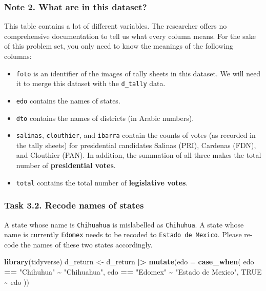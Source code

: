 \documentclass[
]{article}
\newenvironment{Shaded}{\begin{snugshade}}{\end{snugshade}}
\newcommand{\AttributeTok}[1]{\textcolor[rgb]{0.13,0.29,0.53}{#1}}
\newcommand{\ConstantTok}[1]{\textcolor[rgb]{0.56,0.35,0.01}{#1}}
\newcommand{\FunctionTok}[1]{\textcolor[rgb]{0.13,0.29,0.53}{\textbf{#1}}}
\newcommand{\NormalTok}[1]{#1}
\newcommand{\OtherTok}[1]{\textcolor[rgb]{0.56,0.35,0.01}{#1}}
\newcommand{\SpecialCharTok}[1]{\textcolor[rgb]{0.81,0.36,0.00}{\textbf{#1}}}
\newcommand{\StringTok}[1]{\textcolor[rgb]{0.31,0.60,0.02}{#1}}
\begin{document}
\clearpage

\hypertarget{note-2.-what-are-in-this-dataset}{%
\subsubsection{Note 2. What are in this
dataset?}\label{note-2.-what-are-in-this-dataset}}

This table contains a lot of different variables. The researcher offers
no comprehensive documentation to tell us what every column means. For
the sake of this problem set, you only need to know the meanings of the
following columns:

\begin{itemize}
\item
  \texttt{foto} is an identifier of the images of tally sheets in this
  dataset. We will need it to merge this dataset with the
  \texttt{d\_tally} data.
\item
  \texttt{edo} contains the names of states.
\item
  \texttt{dto} contains the names of districts (in Arabic numbers).
\item
  \texttt{salinas}, \texttt{clouthier}, and \texttt{ibarra} contain the
  counts of votes (as recorded in the tally sheets) for presidential
  candidates Salinas (PRI), Cardenas (FDN), and Clouthier (PAN). In
  addition, the summation of all three makes the total number of
  \textbf{presidential votes}.
\item
  \texttt{total} contains the total number of \textbf{legislative
  votes}.
\end{itemize}

\clearpage

\hypertarget{task-3.2.-recode-names-of-states}{%
\subsubsection{Task 3.2. Recode names of
states}\label{task-3.2.-recode-names-of-states}}

A state whose name is \texttt{Chihuahua} is mislabelled as
\texttt{Chihuhua}. A state whose name is currently \texttt{Edomex} needs
to be recoded to \texttt{Estado\ de\ Mexico}. Please re-code the names
of these two states accordingly.

\begin{Shaded}
\begin{Highlighting}[]
\FunctionTok{library}\NormalTok{(tidyverse)}
\NormalTok{d\_return }\OtherTok{\textless{}{-}}\NormalTok{ d\_return }\SpecialCharTok{|\textgreater{}}
  \FunctionTok{mutate}\NormalTok{(}\AttributeTok{edo =} \FunctionTok{case\_when}\NormalTok{(}
\NormalTok{    edo }\SpecialCharTok{==} \StringTok{"Chihuhua"} \SpecialCharTok{\textasciitilde{}} \StringTok{"Chihuahua"}\NormalTok{,}
\NormalTok{    edo }\SpecialCharTok{==} \StringTok{"Edomex"} \SpecialCharTok{\textasciitilde{}} \StringTok{"Estado de Mexico"}\NormalTok{,}
    \ConstantTok{TRUE} \SpecialCharTok{\textasciitilde{}}\NormalTok{ edo}
\NormalTok{  ))}
\end{Highlighting}
\end{Shaded}
\end{document}
